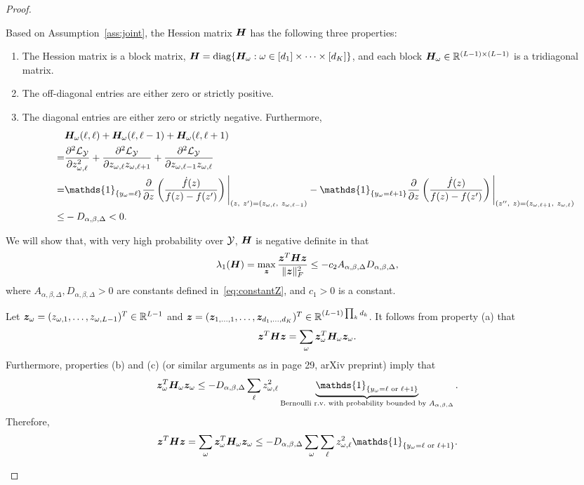 \documentclass[11pt]{article}
\theoremstyle{plain}
\theoremstyle{definition}
\newcommand*{\KeepStyleUnderBrace}[1]{%
\mathop{%
\mathchoice
{\underbrace{\displaystyle#1}}%
{\underbrace{\textstyle#1}}%
{\underbrace{\scriptstyle#1}}%
{\underbrace{\scriptscriptstyle#1}}%
}\limits
}
\begin{document}
\begin{proof}
\begin{enumerate}
Based on Assumption~\ref{ass:joint}, the Hession matrix $\bm{H}$ has the following three properties:
\begin{enumerate}
\item The Hession matrix is a block matrix, $\bm{H}=\text{diag}\{\bm{H}_\omega: \omega\in[d_1]\times \cdots \times [d_K]\}$, and each block $\bm{H}_{\omega}\in\mathbb{R}^{(L-1)\times (L-1)}$ is a tridiagonal matrix. 
\item The off-diagonal entries are either zero or strictly positive.
\item The diagonal entries are either zero or strictly negative. Furthermore, 
\begin{align}
&\mH_\omega(\ell,\ell)+ \mH_\omega(\ell,\ell-1)+\mH_\omega(\ell,\ell+1)\\
=&{\partial^2 \tL_\tY\over \partial z^2_{\omega,\ell}}+{\partial^2 \tL_\tY\over \partial z_{\omega,\ell}z_{\omega,\ell+1}}+{\partial^2 \tL_\tY\over \partial z_{\omega,\ell-1}z_{\omega,\ell}}\\
=&\mathds{1}_{\{y_\omega=\ell\}}{\partial\over \partial z}\left({\dot{f}(z) \over f(z)-f(z')}\right)\Bigg|_{(z,\ z')=(z_{\omega,\ell},\ z_{\omega,\ell-1})}  -\mathds{1}_{\{y_\omega=\ell+1\}}{\partial\over \partial z}\left({\dot{f}(z) \over f(z)-f(z')}\right)\Bigg|_{(z'',\ z)=(z_{\omega,\ell+1},\ z_{\omega,\ell})}\\
\leq &-D_{\alpha,\beta,\Delta}<0.
\end{align}
\end{enumerate}
We will show that, with very high probability over $\mathcal{Y}$, $\bm{H}$ is negative definite in that
\begin{equation}\label{eq:HessionZ}
\lambda_{1}(\bm{H})=\max_{\bm{z}}{\bm{z}^T\bm{H}\bm{z}\over\lVert\bm{z}\rVert_F^2} \leq -c_2A_{\alpha,\beta,\Delta}D_{\alpha,\beta,\Delta},
\end{equation}
where $A_{\alpha,\beta,\Delta}, D_{\alpha,\beta,\Delta}>0$ are constants defined in~\eqref{eq:constantZ}, and $c_1>0$ is a constant. 

Let $\bm{z}_\omega=(z_{\omega,1},\ldots,z_{\omega,L-1})^T\in\mathbb{R}^{L-1}$ and $\bm{z}=(\bm{z}_{1,\ldots,1},\ldots,\bm{z}_{d_1,\ldots,d_K})^T\in\mathbb{R}^{(L-1)\prod_k d_k}$. It follows from property (a) that
\[
\bm{z}^T\bm{H}\bm{z} =\sum_{\omega}\bm{z}_\omega^T \bm{H}_{\omega} \bm{z}_\omega.
\]
Furthermore, properties (b) and (c) (or similar arguments as in page 29, arXiv preprint) imply that
\begin{equation}
\mz_\omega^T \mH_{\omega} \mz_\omega \leq -D_{\alpha,\beta,\Delta} \sum_{\ell}z^2_{\omega,\ell}\KeepStyleUnderBrace{\mathds{1}_{\{y_\omega=\ell \text{ or }\ell+1\}}}_{\text{Bernoulli r.v.\ with probability bounded by $A_{\alpha,\beta,\Delta}$}}.
\end{equation}
Therefore,
\begin{equation}\label{eq:sum}
\mz^T\mH\mz =\sum_{\omega}\mz_\omega^T \mH_{\omega} \mz_\omega \leq -D_{\alpha,\beta,\Delta}\sum_{\omega}\sum_{\ell} z^2_{\omega,\ell}\mathds{1}_{\{y_\omega=\ell \text{ or }\ell+1\}}.
\end{equation}


\end{enumerate}
\end{proof}
\end{document}
